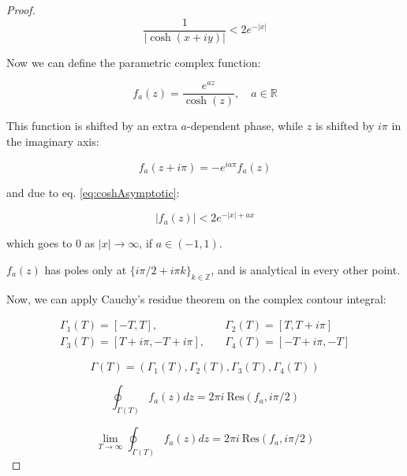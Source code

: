 \documentclass{article}
\theoremstyle{definition}
\begin{document}
\begin{proof}
    \begin{equation}
    \label{eq:coshAsymptotic}
    \frac{1}{|\cosh(x+i y)|} < 2 e^{-|x|}
    \end{equation}

    Now we can define the parametric complex function:

    \begin{equation}
        f_a(z) = \frac{e^{a z}}{\cosh(z)}, \quad a \in \mathbb{R}
    \end{equation}

    This function is shifted by an extra $a$-dependent phase, while $z$ is shifted by $i \pi$ in the imaginary axis:

    \begin{equation}
        f_a(z+i \pi) = - e^{i a \pi} f_a(z)
    \end{equation}

    and due to eq. \eqref{eq:coshAsymptotic}:

    \begin{equation}
        |f_a(z)| < 2 e^{-|x|+a x}
    \end{equation}

    which goes to 0 as $|x| \to \infty$, if $a \in (-1,1)$.

    $f_a(z)$ has poles only at $\{i \pi/2 + i \pi k \}_{k\in \mathbb{Z}}$, and is analytical in every other point.

    Now, we can apply Cauchy's residue theorem on the complex contour integral:

    \begin{equation}
        \begin{split}
            \Gamma_1(T) = [-T,T], &\quad \Gamma_2(T) = [T,T+i \pi] \\
            \Gamma_3(T) = [T+ i \pi, -T + i \pi], &\quad \Gamma_4(T) = [-T + i \pi,-T]
        \end{split}
    \end{equation}

    \begin{equation}
        \Gamma(T) = (\Gamma_1(T), \Gamma_2(T), \Gamma_3(T), \Gamma_4(T)) 
    \end{equation}

    \begin{equation}
        \oint_{\Gamma(T)} f_a(z) dz = 2 \pi i \  \mathrm{Res}(f_a,i \pi/2)
    \end{equation}

    \begin{equation}
        \lim_{T \to \infty} \oint_{\Gamma(T)} f_a(z) dz = 2 \pi i \  \mathrm{Res}(f_a,i \pi/2)
    \end{equation}


\end{proof}
\end{document}
